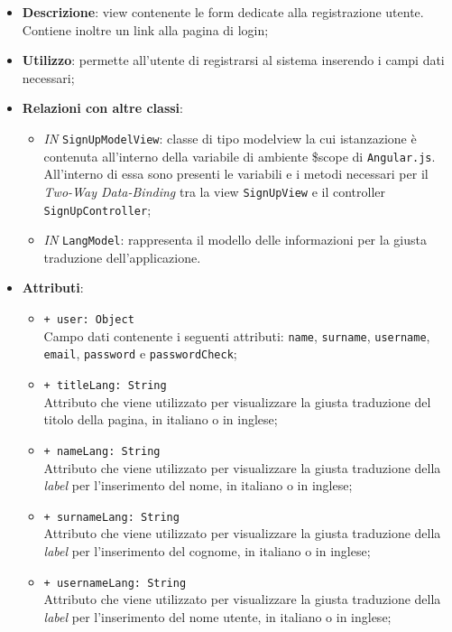 \begin{itemize}
	\item \textbf{Descrizione}: view contenente le form dedicate alla registrazione utente. Contiene inoltre un link alla pagina di login;
	\item \textbf{Utilizzo}: permette all'utente di registrarsi al sistema inserendo i campi dati necessari;
	\item \textbf{Relazioni con altre classi}:
	\begin{itemize}
		\item \textit{IN} \texttt{SignUpModelView}: classe di tipo modelview la cui istanzazione è contenuta all'interno della variabile di ambiente \$scope di \texttt{Angular.js}. All'interno di essa sono presenti le variabili e i metodi necessari per il \textit{Two-Way Data-Binding} tra la view \texttt{SignUpView} e il controller \texttt{SignUpController};
		\item \textit{IN} \texttt{LangModel}: rappresenta il modello delle informazioni per la giusta traduzione dell'applicazione.
	\end{itemize}
	\item \textbf{Attributi}:
	\begin{itemize}
		\item \texttt{+ user: Object} \\ Campo dati contenente i seguenti attributi: \texttt{name}, \texttt{surname}, \texttt{username}, \texttt{email}, \texttt{password} e \texttt{passwordCheck};
		\item \texttt{+ titleLang: String} \\ Attributo che viene utilizzato per visualizzare la giusta traduzione del titolo della pagina, in italiano o in inglese;
		\item \texttt{+ nameLang: String} \\ Attributo che viene utilizzato per visualizzare la giusta traduzione della \textit{label} per l'inserimento del nome, in italiano o in inglese;
		\item \texttt{+ surnameLang: String} \\ Attributo che viene utilizzato per visualizzare la giusta traduzione della \textit{label} per l'inserimento del cognome, in italiano o in inglese;
		\item \texttt{+ usernameLang: String} \\ Attributo che viene utilizzato per visualizzare la giusta traduzione della \textit{label} per l'inserimento del nome utente, in italiano o in inglese;

\end{itemize}
\end{itemize}
